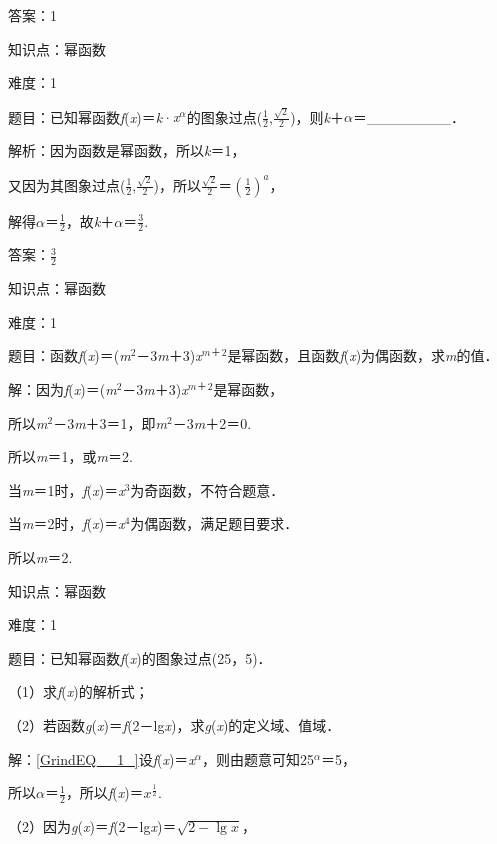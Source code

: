 \documentclass{article} %
\begin{document}
答案：1

知识点：幂函数

难度：1

题目：已知幂函数\textit{f}(\textit{x})＝\textit{k}·\textit{x${}^{\alpha }$}的图象过点($\frac{1}{2}$,$\frac{\sqrt{2}}{2}$)，则\textit{k}＋\textit{$\alpha$}＝\_\_\_\_\_\_\_\_．

解析：因为函数是幂函数，所以\textit{k}＝1，

又因为其图象过点($\frac{1}{2}$,$\frac{\sqrt{2}}{2}$)，所以$\frac{\sqrt{2}}{2}$＝$(\frac{1}{2})^{a}$，

解得\textit{$\alpha$}＝$\frac{1}{2}$，故\textit{k}＋\textit{$\alpha$}＝$\frac{3}{2}$.

答案：$\frac{3}{2}$

知识点：幂函数

难度：1

题目：函数\textit{f}(\textit{x})＝(\textit{m}${}^{2}$－3\textit{m}＋3)\textit{x${}^{m}$}${}^{\textrm{＋}}$${}^{2}$是幂函数，且函数\textit{f}(\textit{x})为偶函数，求\textit{m}的值．

解：因为\textit{f}(\textit{x})＝(\textit{m}${}^{2}$－3\textit{m}＋3)\textit{x${}^{m}$}${}^{\textrm{＋}}$${}^{2}$是幂函数，

所以\textit{m}${}^{2}$－3\textit{m}＋3＝1，即\textit{m}${}^{2}$－3\textit{m}＋2＝0.

所以\textit{m}＝1，或\textit{m}＝2.

当\textit{m}＝1时，\textit{f}(\textit{x})＝\textit{x}${}^{3}$为奇函数，不符合题意．

当\textit{m}＝2时，\textit{f}(\textit{x})＝\textit{x}${}^{4}$为偶函数，满足题目要求．

所以\textit{m}＝2.

知识点：幂函数

难度：1

题目：已知幂函数\textit{f}(\textit{x})的图象过点(25，5)．

（1）求\textit{f}(\textit{x})的解析式；

（2）若函数\textit{g}(\textit{x})＝\textit{f}(2－lg\textit{x})，求\textit{g}(\textit{x})的定义域、值域．

解：\eqref{GrindEQ__1_}设\textit{f}(\textit{x})＝\textit{x${}^{\alpha }$}，则由题意可知25\textit{${}^{\alpha }$}＝5，

所以\textit{$\alpha$}＝$\frac{1}{2}$，所以\textit{f}(\textit{x})＝$x^{\frac{1}{2}}$.

（2）因为\textit{g}(\textit{x})＝\textit{f}(2－lg\textit{x})＝$\sqrt{2-\lg x}$，
\end{document}
